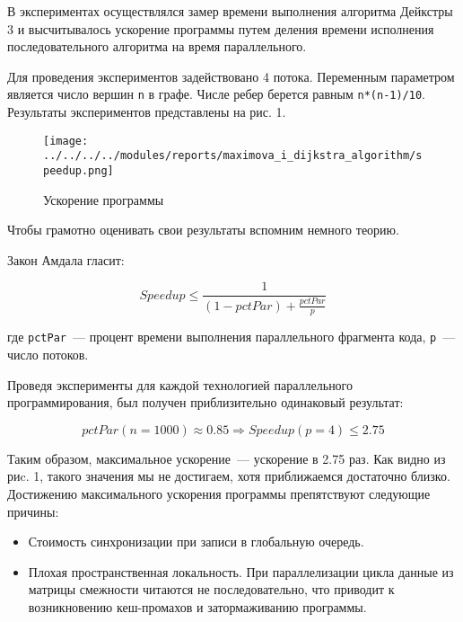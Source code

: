 \documentclass{article}
\begin{document}
\par В экспериментах осуществлялся замер времени выполнения алгоритма Дейкстры 3 и высчитывалось ускорение программы путем деления времени исполнения последовательного алгоритма на время параллельного. 

\par Для проведения экспериментов задействовано 4 потока. Переменным параметром является число вершин \verb|n| в графе. Числе ребер берется равным \verb|n*(n-1)/10|. Результаты экспериментов представлены на рис. 1.

\begin{figure}[h]
\centering
\texttt{[image: ../../../../modules/reports/maximova\_i\_dijkstra\_algorithm/speedup.png]}
\caption{Ускорение программы}
\end{figure}

\newpage

\par Чтобы грамотно оценивать свои результаты вспомним немного теорию. 

\par Закон Амдала гласит: 

\begin{equation}
Speedup \leq \frac{1}{(1-pctPar) + \frac{pctPar}{p}}
\end{equation} 

где \verb|pctPar|~--- процент времени выполнения параллельного фрагмента кода, \verb|p|~--- число потоков. 

\par Проведя эксперименты для каждой технологией параллельного программирования, был получен приблизительно одинаковый результат:

\begin{equation}
pctPar(n=1000)\approx 0.85 \Rightarrow Speedup(p = 4) \leq 2.75
\end{equation}

\par Таким образом, максимальное ускорение~--- ускорение в 2.75 раз. Как видно из риc. 1, такого значения мы не достигаем, хотя приближаемся достаточно близко. Достижению максимального ускорения программы препятствуют следующие причины: 

\begin{itemize}
\item Стоимость синхронизации при записи в глобальную очередь.
\item Плохая пространственная локальность. При параллелизации цикла данные из матрицы смежности читаются не последовательно, что приводит к возникновению кеш-промахов и затормаживанию программы.
\end{itemize} 
\end{document}
